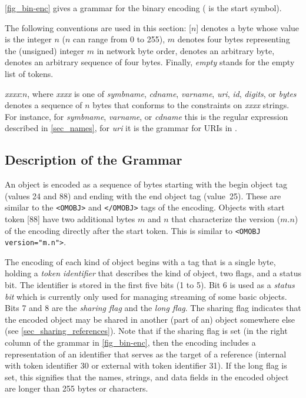 \ref{fig_bin-enc} gives a grammar for the binary encoding ( is the start
symbol).

The following conventions are used in this section: [$n$] denotes a byte whose value is
the integer $n$ ($n$ can range from 0 to 255), {$m$} denotes four bytes representing the
(unsigned) integer $m$ in network byte order, \abyte denotes an arbitrary byte, \fourbytes denotes
an arbitrary sequence of four bytes.  Finally, \emph{empty} stands for the empty list of
tokens.

\emph{xxxx}:$n$, where \emph{xxxx} is one of \emph{symbname}, \emph{cdname},
\emph{varname}, \emph{uri}, \emph{id}, \emph{digits}, or \emph{bytes} denotes a sequence
of $n$ bytes that conforms to the constraints on \emph{xxxx} strings. For instance, for
\emph{symbname}, \emph{varname}, or \emph{cdname} this is the regular expression described
in \ref{sec_names}, for \emph{uri} it is the grammar for URIs in \cite{IETF2396}.

\subsection{Description of the Grammar}\label{sec_bin-desc}
  
An \OM object is encoded as a sequence of bytes starting with the begin object tag (values
24 and 88) and ending with the end object tag (value~25). These are similar to the
\lstinline|<OMOBJ>| and \lstinline|</OMOBJ>| tags of the \XML encoding. Objects with
start token [88] have two additional bytes $m$ and $n$ that characterize the version
($m.n$) of the encoding directly after the start token. This is similar to
\lstinline|<OMOBJ version="m.n">|.

The encoding of each kind of \OM object begins with a tag that is a single byte, holding a
\emph{token identifier} that describes the kind of object, two flags, and a status
bit. The identifier is stored in the first five bits (1 to 5). Bit 6 is used as a
\emph{status bit} which is currently only used for managing streaming of some basic
objects. Bits 7 and 8 are the \emph{sharing flag} and the \emph{long flag}. The sharing
flag indicates that the encoded object may be shared in another (part of an) object
somewhere else (see \ref{sec_sharing_references}). Note that if the sharing flag is set
(in the right column of the grammar in \ref{fig_bin-enc}, then the encoding includes a
representation of an identifier that serves as the target of a reference (internal with
token identifier 30 or external with token identifier 31). If the long flag is set, this
signifies that the names, strings, and data fields in the encoded \OM object are longer
than 255 bytes or characters.

